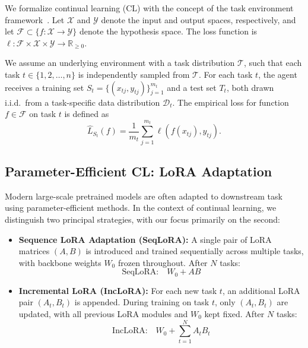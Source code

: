 \documentclass[letterpaper]{article} %
\begin{document}
We formalize continual learning (CL) with the concept of the task environment framework~\cite{pentinaPACBayesianBoundLifelong2014}. Let $\mathcal{X}$ and $\mathcal{Y}$ denote the input and output spaces, respectively, and let $\mathcal{F} \subset \{f : \mathcal{X} \rightarrow \mathcal{Y}\}$ denote the hypothesis space. The loss function is $\ell : \mathcal{F} \times \mathcal{X} \times \mathcal{Y} \rightarrow \mathbb{R}_{\geq 0}$.

We assume an underlying environment with a task distribution $\mathcal{T}$, such that each task $t \in \{1, 2, \ldots, n\}$ is independently sampled from $\mathcal{T}$. For each task $t$, the agent receives a training set $S_t = \{(x_{tj}, y_{tj})\}_{j=1}^{m_t}$ and a test set $T_t$, both drawn i.i.d.\ from a task-specific data distribution $\mathcal{D}_t$. The empirical loss for function $f \in \mathcal{F}$ on task $t$ is defined as
\begin{equation}
    \hat{L}_{S_t}(f) = \frac{1}{m_t} \sum_{j=1}^{m_t} \ell(f(x_{tj}), y_{tj}).
\end{equation}

\subsection{Parameter-Efficient CL: LoRA Adaptation}

Modern large-scale pretrained models are often adapted to downstream task using parameter-efficient methods. In the context of continual learning, we distinguish two principal strategies, with our focus primarily on the second:
\begin{itemize}
    \item \textbf{Sequence LoRA Adaptation (SeqLoRA):} A single  pair of LoRA matrices $(A, B)$ is introduced and trained sequentially across multiple tasks, with backbone weights $W_0$ frozen throughout. After $N$ tasks:
    $$
        \text{SeqLoRA:} \quad W_0 + AB
    $$
    \item \textbf{Incremental LoRA (IncLoRA):} For each new task $t$, an additional LoRA pair $(A_t, B_t)$ is appended. During training on task $t$, only $(A_t, B_t)$ are updated, with all previous LoRA modules and $W_0$ kept fixed.  After $N$ tasks:
    \begin{equation*}
        \text{IncLoRA:} \quad W_0 + \sum_{t=1}^N A_t B_t
    \end{equation*}
\end{itemize}
\end{document}

